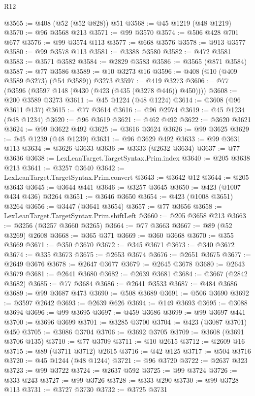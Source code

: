 \begin{lexlean}{R12}
\begin{coremodule}
{{{{{{{{{{{{{{{{{{{{{{{{{{{{{{{{{{{{{{{{{{{{{{{{{{{{{{{{{{{{{{{{{{{{{{{{{{{{{{{{{{{{{{{{{{{{{{{{{{{{{{{{{{@3565 := @408 (@52 (@52 @828)) @51
@3568 := @45 @1219 (@48 @1219)
@3570 := @96 @3568 @213
@3571 := @99 @3570
@3574 := @506 @428 @701 @677
@3576 := @99 @3574 @113
@3577 := @668 @3576
@3578 := @913 @3577
@3580 := @99 @3578 @113
@3581 := @3388 @3580
@3582 := @472 @3581
@3583 := @3571 @3582
@3584 := @2829 @3583
@3586 := @3565 (@871 @3584)
@3587 := @77 @3586
@3589 := @10 @3273 @16
@3596 := @408 (@10 (@409 @3589 @3273) (@54 @3589)) @3273
@3597 := @419 @3273
@3606 := @77 (@3596 (@3597 @148 (@430 (@423 (@435 (@3278 @446)) @450))))
@3608 := @200 @3589 @3273
@3611 := @45 @1224 (@48 @1224)
@3614 := @3608 (@96 @3611 @137)
@3615 := @77 @3614
@3616 := @96 @2974
@3619 := @45 @1234 (@48 @1234)
@3620 := @96 @3619
@3621 := @462 @492
@3622 := @3620 @3621
@3624 := @99 @3622 @492
@3625 := @3616 @3624
@3626 := @99 @3625
@3629 := @45 @1239 (@48 @1239)
@3631 := @96 @3629 @492
@3633 := @99 @3631 @113
@3634 := @3626 @3633
@3636 := @3333 (@2632 @3634)
@3637 := @77 @3636
@3638 := LexLeanTarget.TargetSyntax.Prim.index
@3640 := @205 @3638 @213
@3641 := @3257 @3640
@3642 := LexLeanTarget.TargetSyntax.Prim.convert
@3643 := @3642 @12
@3644 := @205 @3643
@3645 := @3644 @441
@3646 := @3257 @3645
@3650 := @423 (@1007 @434 @436) @3264
@3651 := @3646 @3650
@3654 := @423 (@1008 @3651) @3264
@3656 := @3447 (@3641 @3654)
@3657 := @77 @3656
@3658 := LexLeanTarget.TargetSyntax.Prim.shiftLeft
@3660 := @205 @3658 @213
@3663 := @3256 (@3257 @3660 @3265)
@3664 := @77 @3663
@3667 := @89 (@52 @3269) @2608
@3668 := @365 @371
@3669 := @360 @3668
@3670 := @355 @3669
@3671 := @350 @3670
@3672 := @345 @3671
@3673 := @340 @3672
@3674 := @335 @3673
@3675 := @2653 @3674
@3676 := @2651 @3675
@3677 := @2649 @3676
@3678 := @2647 @3677
@3679 := @2645 @3678
@3680 := @2643 @3679
@3681 := @2641 @3680
@3682 := @2639 @3681
@3684 := @3667 (@2842 @3682)
@3685 := @77 @3684
@3686 := @2641 @3533
@3687 := @484 @3686
@3689 := @99 @3687 @473
@3690 := @508 @3689
@3691 := @506 @3690
@3692 := @3597 @2642
@3693 := @2639 @626
@3694 := @149 @3693
@3695 := @3088 @3694
@3696 := @99 @3695
@3697 := @459 @3686
@3699 := @99 @3697 @441
@3700 := @3696 @3699
@3701 := @3285 @3700
@3704 := @423 (@3087 @3701) @450
@3705 := @3086 @3704
@3706 := @3692 @3705
@3709 := @3608 (@3691 @3706 @135)
@3710 := @77 @3709
@3711 := @10 @2615
@3712 := @2609 @16
@3715 := @89 (@3711 @3712) @2615
@3716 := @42 @125
@3717 := @504 @3716
@3720 := @45 @1244 (@48 @1244)
@3721 := @96 @3720
@3722 := @2637 @323
@3723 := @99 @3722
@3724 := @2637 @592
@3725 := @99 @3724
@3726 := @333 @243
@3727 := @99 @3726
@3728 := @333 @290
@3730 := @99 @3728 @113
@3731 := @3727 @3730
@3732 := @3725 @3731
}}}}}}}}}}}}}}}}}}}}}}}}}}}}}}}}}}}}}}}}}}}}}}}}}}}}}}}}}}}}}}}}}}}}}}}}}}}}}}}}}}}}}}}}}}}}}}}}}}}}}}}}}}
\end{coremodule}
\end{lexlean}
